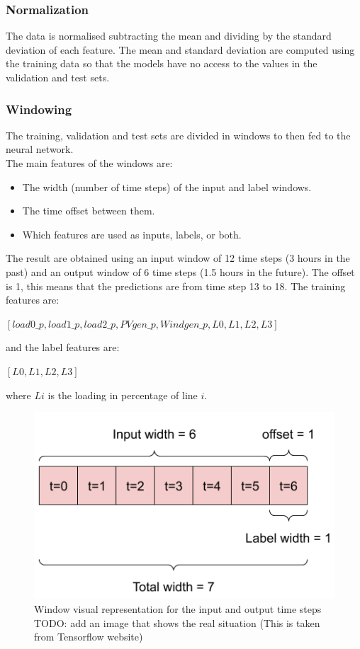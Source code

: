 \subsubsection{Normalization}
The data is normalised subtracting the mean and dividing by the standard deviation of each feature. The mean and standard deviation are computed using the training data so that the models have no access to the values in the validation and test sets.

\subsubsection{Windowing}
The training, validation and test sets are divided in windows to then fed to the neural network. \\
The main features of the windows are:
\begin{itemize}
    \item The width (number of time steps) of the input and label windows.
    \item The time offset between them.
    \item Which features are used as inputs, labels, or both.
\end{itemize}

The result are obtained using an input window of 12 time steps (3 hours in the past) and an output window of 6 time steps (1.5 hours in the future). The offset is 1, this means that the predictions are from time step 13 to 18. The training features are:
\begin{algorithmic}
\State $[load0\_p, load1\_p, load2\_p, PVgen\_p, Wind gen\_p, L0, L1, L2, L3]$
\end{algorithmic}
and the label features are:
\begin{algorithmic}
\State $[L0, L1, L2, L3]$
\end{algorithmic}
where $Li$ is the loading in percentage of line $i$.

\begin{figure}[h]
    \centering
    \includegraphics[width=.7\linewidth]{images/GYM-ANM/DATASET PLOTS/raw_window_1h.png}
    \caption[GYM-ANM datasets windowing]{Window visual representation for the input and output time steps \\
    TODO: add an image that shows the real situation (This is taken from Tensorflow website)}
    \label{fig:net_sit3}
\end{figure}

